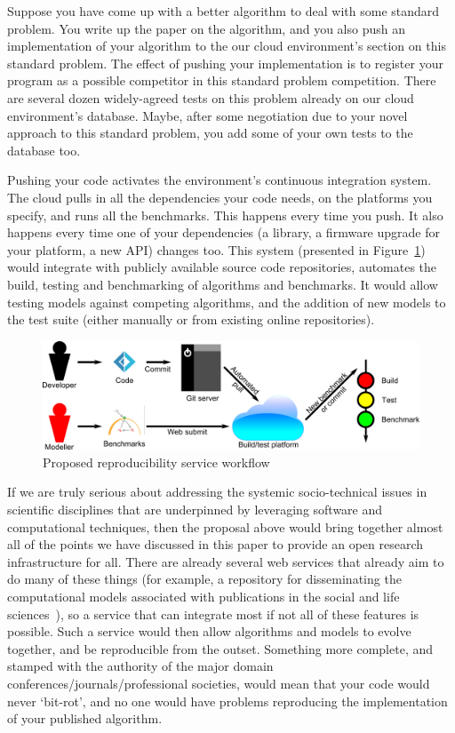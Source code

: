 \documentclass[a4paper,11pt]{article}
\begin{document}
Suppose you have come up with a better algorithm to deal with some
standard problem.  You write up the paper on the algorithm, and you
also push an implementation of your algorithm to the our cloud
environment's section on this standard problem. The effect of pushing
your implementation is to register your program as a possible
competitor in this standard problem competition. There are several
dozen widely-agreed tests on this problem already on our cloud
environment's database. Maybe, after some negotiation due to your
novel approach to this standard problem, you add some of your own
tests to the database too.

Pushing your code activates the environment's continuous integration
system.  The cloud pulls in all the dependencies your code needs, on
the platforms you specify, and runs all the benchmarks. This happens
every time you push. It also happens every time one of your
dependencies (a library, a firmware upgrade for your platform, a new
API) changes too. This system (presented in Figure~\ref{fig:workflow})
would integrate with publicly available source code repositories,
automates the build, testing and benchmarking of algorithms and
benchmarks. It would allow testing models against competing
algorithms, and the addition of new models to the test suite (either
manually or from existing online repositories).

\begin{figure}[!ht]
\centering
\includegraphics[width=0.9\columnwidth]{images/workflow.png}
\caption{Proposed reproducibility service workflow}
\label{fig:workflow} 
\end{figure}

If we are truly serious about addressing the systemic socio-technical
issues in scientific disciplines that are underpinned by leveraging
software and computational techniques, then the proposal above would
bring together almost all of the points we have discussed in this
paper to provide an open research infrastructure for all. There are
already several web services that already aim to do many of these
things (for example, a repository for disseminating the computational
models associated with publications in the social and life
sciences~\cite{rollins-et-al:2014}), so a service that can integrate
most if not all of these features is possible. Such a service would
then allow algorithms and models to evolve together, and be
reproducible from the outset. Something more complete, and stamped
with the authority of the major domain
conferences/journals/professional societies, would mean that your code
would never `bit-rot', and no one would have problems reproducing the
implementation of your published algorithm.
\end{document}

